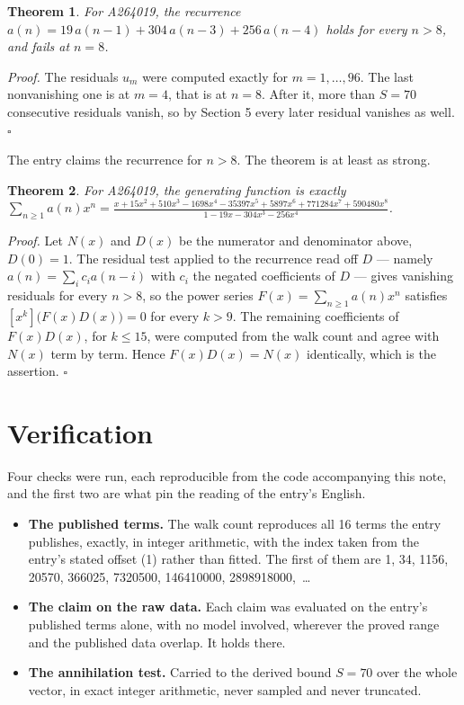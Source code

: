 \documentclass[11pt]{article}
\newtheorem{theorem}{Theorem}
\theoremstyle{definition}
\begin{document}
\begin{theorem} For A264019, the recurrence $a(n) = 19\,a(n-1) + 304\,a(n-3) + 256\,a(n-4)$ holds for every $n > 8$, and fails at $n = 8$.\end{theorem}

{\itshape Proof.} The residuals $u_m$ were computed exactly for $m = 1,\dots,96$. The last nonvanishing one is at $m = 4$, that is at $n = 8$. After it, more than $S = 70$ consecutive residuals vanish, so by Section 5 every later residual vanishes as well. $\square$

The entry claims the recurrence for $n > 8$. The theorem is at least as strong.

\begin{theorem} For A264019, the generating function is exactly $\sum_{n\ge 1} a(n)x^n = \frac{x + 15x^{2} + 510x^{3} - 1698x^{4} - 35397x^{5} + 5897x^{6} + 771284x^{7} + 590480x^{8}}{1 - 19x - 304x^{3} - 256x^{4}}$.\end{theorem}

{\itshape Proof.} Let $N(x)$ and $D(x)$ be the numerator and denominator above, $D(0)=1$. The residual test applied to the recurrence read off $D$ --- namely $a(n) = \sum_i c_i a(n-i)$ with $c_i$ the negated coefficients of $D$ --- gives vanishing residuals for every $n > 8$, so the power series $F(x)=\sum_{n\ge 1}a(n)x^n$ satisfies $[x^k]\bigl(F(x)D(x)\bigr) = 0$ for every $k > 9$. The remaining coefficients of $F(x)D(x)$, for $k \le 15$, were computed from the walk count and agree with $N(x)$ term by term. Hence $F(x)D(x) = N(x)$ identically, which is the assertion. $\square$

\section{Verification}

Four checks were run, each reproducible from the code accompanying this note, and the first two are what pin the reading of the entry's English.

\begin{itemize}

\item {\bfseries The published terms.} The walk count reproduces all 16 terms the entry publishes, exactly, in integer arithmetic, with the index taken from the entry's stated offset (1) rather than fitted. The first of them are 1, 34, 1156, 20570, 366025, 7320500, 146410000, 2898918000,~\dots

\item {\bfseries The claim on the raw data.} Each claim was evaluated on the entry's published terms alone, with no model involved, wherever the proved range and the published data overlap. It holds there.

\item {\bfseries The annihilation test.} Carried to the derived bound $S = 70$ over the whole vector, in exact integer arithmetic, never sampled and never truncated.

\end{itemize}
\end{document}
